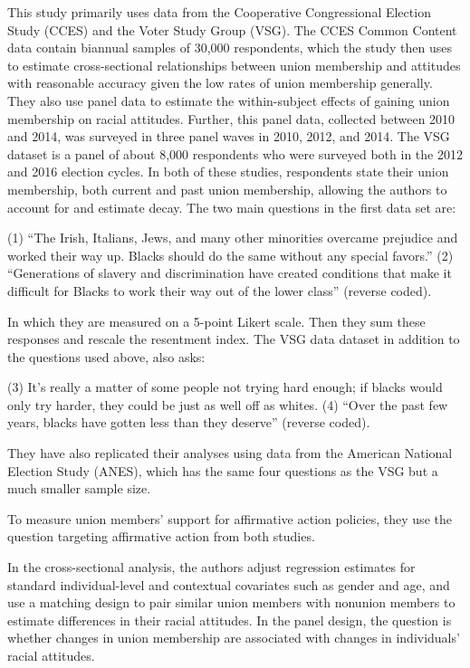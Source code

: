 \documentclass[12pt,letterpaper]{article}
\begin{document}
	This study primarily uses data from the Cooperative Congressional Election Study (CCES) and the Voter Study Group (VSG). The CCES Common Content data contain biannual samples of 30,000 respondents, which the study then uses to estimate cross-sectional relationships between union membership and attitudes with reasonable accuracy given the low rates of union membership generally. They also use panel data to estimate the within-subject effects of gaining union membership on racial attitudes. Further, this panel data, collected between 2010 and 2014, was surveyed in three panel waves in 2010, 2012, and 2014.  The VSG dataset is a panel of about 8,000 respondents who were surveyed both in the 2012 and 2016 election cycles.
	In both of these studies, respondents state their union membership, both current and past union membership, allowing the authors to account for and estimate decay. The two main questions in the first data set are: 
	
	(1) “The Irish, Italians, Jews, and many other minorities overcame prejudice and worked their way up. Blacks should do the same without any special favors.”
	(2) “Generations of slavery and discrimination have created conditions that make it difficult for Blacks to work their way out of the lower class” (reverse coded).
	
	In which they are measured on a 5-point Likert scale. Then they sum these responses and rescale the resentment index. The VSG data dataset in addition to the questions used above, also asks:
	
	(3) It’s really a matter of some people not trying hard enough; if blacks would only try harder, they could be just as well off as whites. 
	(4) “Over the past few years, blacks have gotten less than they deserve” (reverse coded).
	
	They have also replicated their analyses using data from the American National Election Study (ANES), which has the same four questions as the VSG but a much smaller sample size. 
	
	To measure union members' support for affirmative action policies, they use the question targeting affirmative action from both studies. 
	
	In the cross-sectional analysis, the authors adjust regression estimates for standard individual-level and contextual covariates such as gender and age, and use a matching design to pair similar union members with nonunion members to estimate differences in their racial attitudes. In the panel design, the question is whether changes in union membership are associated with changes in individuals' racial attitudes. 
	
\end{document}
